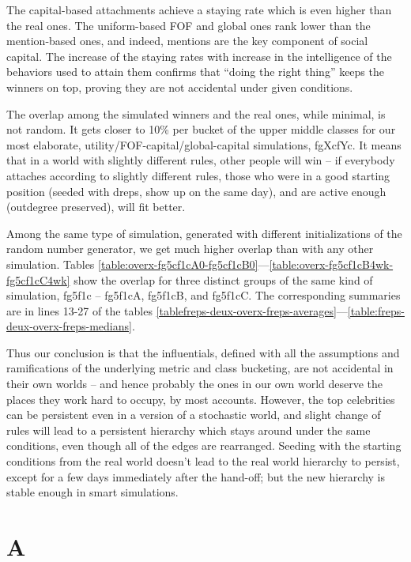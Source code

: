 \documentclass[10pt,oneside]{memoir}
\def\mybibliostyle{plain}
\def\bibliocommand{}
\begin{document}
The capital-based attachments achieve a staying rate which is even higher than the real ones.  The uniform-based FOF and global ones rank lower than the mention-based ones, and indeed, mentions are the key component of social capital.  The increase of the staying rates with increase in the intelligence of the behaviors used to attain them confirms that ``doing the right thing'' keeps the winners on top, proving they are not accidental under given conditions.


The overlap among the simulated winners and the real ones, while minimal, is not random.  It gets closer to 10\% per bucket of the upper middle classes for our most elaborate, utility/FOF-capital/global-capital simulations, fgXcfYc.  It means that in a world with slightly different rules, other people will win -- if everybody attaches according to slightly different rules, those who were in a good starting position (seeded with dreps, show up on the same day), and are active enough (outdegree preserved), will fit better.


Among the same type of simulation, generated with different initializations of the random number generator, we get much higher overlap than with any other simulation.  Tables \ref{table:overx-fg5cf1cA0-fg5cf1cB0}---\ref{table:overx-fg5cf1cB4wk-fg5cf1cC4wk} show the overlap for three distinct groups of the same kind of simulation, fg5f1c -- fg5f1cA, fg5f1cB, and fg5f1cC.  The corresponding summaries are in lines 13-27 of the tables \ref{tablefreps-deux-overx-freps-averages}---\ref{table:freps-deux-overx-freps-medians}.


Thus our conclusion is that the influentials, defined with all the assumptions and ramifications of the underlying metric and class bucketing, are not accidental in their own worlds -- and hence probably the ones in our own world deserve the places they work hard to occupy, by most accounts.  However, the top celebrities can be persistent even in a version of a stochastic world, and slight change of rules will lead to a persistent hierarchy which stays around under the same conditions, even though all of the edges are rearranged.  Seeding with the starting conditions from the real world doesn't lead to the real world hierarchy to persist, except for a few days immediately after the hand-off; but the new hierarchy is stable enough in smart simulations.



\appendixpage
\appendix
\chapter{A}
\pagestyle{plain}


%
%

\backmatter


\bibliocommand

\printglossary


\printindex
\end{document}

